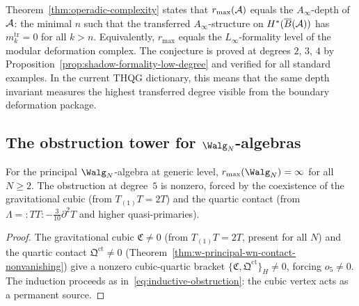 \begin{remark}
\label{rem:operadic-complexity-holographic}
Theorem~\ref{thm:operadic-complexity} states that
$r_{\max}(\mathcal{A})$ equals the $A_\infty$-depth of~$\mathcal{A}$:
the minimal $n$ such that the transferred
$A_\infty$-structure on $H^*(\overline{B}(\mathcal{A}))$ has
$m_k^{\mathrm{tr}} = 0$ for all $k > n$. Equivalently,
$r_{\max}$ equals the $L_\infty$-formality level of
the modular deformation complex. The conjecture is
proved at degrees $2$, $3$, $4$ by
Proposition~\ref{prop:shadow-formality-low-degree}
and verified for all standard examples. In the
current THQG dictionary, this means that the same depth
invariant measures the highest transferred degree visible
from the boundary deformation package.
\end{remark}


\subsection{The obstruction tower for $\Walg_N$-algebras}
\label{subsec:wn-obstruction-tower}

\begin{proposition}
\label{prop:wn-class-m}
For the principal $\Walg_N$-algebra at generic level,
$r_{\max}(\Walg_N) = \infty$ for all $N \geq 2$.
The obstruction at degree~$5$ is nonzero, forced by
the coexistence of the gravitational cubic
(from $T_{(1)}T = 2T$) and the quartic contact
(from $\Lambda = {:}TT{:} - \frac{3}{10}\partial^2 T$
and higher quasi-primaries).
\end{proposition}

\begin{proof}
The gravitational cubic $\mathfrak{C} \neq 0$ (from
$T_{(1)}T = 2T$, present for all $N$) and the quartic
contact $\mathfrak{Q}^{\mathrm{ct}} \neq 0$
(Theorem~\ref{thm:w-principal-wn-contact-nonvanishing})
give a nonzero cubic-quartic bracket
$\{\mathfrak{C}, \mathfrak{Q}^{\mathrm{ct}}\}_H \neq 0$,
forcing $o_5 \neq 0$. The induction proceeds as
in~\eqref{eq:inductive-obstruction}: the cubic vertex
acts as a permanent source.
\end{proof}

